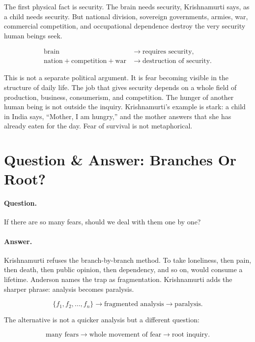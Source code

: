 \documentclass[11pt,oneside]{book}
\begin{document}
The first physical fact is security. The brain needs security, Krishnamurti says, as a child needs security. But national division, sovereign governments, armies, war, commercial competition, and occupational dependence destroy the very security human beings seek.

\begin{align}
\text{brain} &\longrightarrow \text{requires security},\\
\text{nation}+\text{competition}+\text{war} &\longrightarrow \text{destruction of security}.
\end{align}

This is not a separate political argument. It is fear becoming visible in the structure of daily life. The job that gives security depends on a whole field of production, business, consumerism, and competition. The hunger of another human being is not outside the inquiry. Krishnamurti's example is stark: a child in India says, ``Mother, I am hungry,'' and the mother answers that she has already eaten for the day. Fear of survival is not metaphorical.

\section{Question \& Answer: Branches Or Root?}

\paragraph{Question.}
If there are so many fears, should we deal with them one by one?

\paragraph{Answer.}
Krishnamurti refuses the branch-by-branch method. To take loneliness, then pain, then death, then public opinion, then dependency, and so on, would consume a lifetime. Anderson names the trap as fragmentation. Krishnamurti adds the sharper phrase: analysis becomes paralysis.

\begin{equation}
\{f_1,f_2,\ldots,f_n\}
\longrightarrow
\text{fragmented analysis}
\longrightarrow
\text{paralysis}.
\end{equation}

The alternative is not a quicker analysis but a different question:

\begin{equation}
\text{many fears}
\longrightarrow
\text{whole movement of fear}
\longrightarrow
\text{root inquiry}.
\end{equation}
\end{document}
